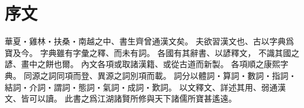 \chapter*{序文}
華夏・雞林・扶桑・南越之中、書生齊曾通漢文矣。
夫欲習漢文也、古以字典爲寶及今。
字典雖有字彙之釋、而未有詞。
各國有其辭書、以諺釋文，
不識其國之諺、畫中之餅也爾。
內文各項或取諸漢籍、或從古道而新製。
各項順之康熙字典。
同源之詞同項而登、異源之詞別項而載。
詞分以體詞・算詞・數詞・指詞・結詞・介詞・謂詞・態詞・氣詞・成詞・歎詞。
以文釋文、詳述其用、弱通漢文、皆可以讀。
此書之爲江湖諸賢所修與天下諸儒所寶甚遙遠。
